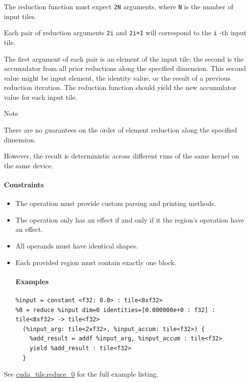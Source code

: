 \documentclass{article}
\begin{document}
The reduction function must expect \texttt{2N} arguments, where \texttt{N} is the number of input tiles.

Each pair of reduction arguments \texttt{2i} and \texttt{2i+1} will correspond to the \texttt{i} -th input tile.

The first argument of each pair is an element of the input tile; the second is the accumulator from all prior reductions along the specified dimension. This second value might be input element, the identity value, or the result of a previous reduction iteration. The reduction function should yield the new accumulator value for each input tile.


Note


There are no guarantees on the order of element reduction along the specified dimension.

However, the result is deterministic across different runs of the same kernel on the same device.



\paragraph{Constraints}

\begin{itemize}
\item The operation must provide custom parsing and printing methods.
\item The operation only has an effect if and only if it the region's operation have an effect.
\item All operands must have identical shapes.
\item Each provided region must contain exactly one block.


\paragraph{Examples}

\begin{lstlisting}
%input = constant <f32: 0.0> : tile<8xf32>
%0 = reduce %input dim=0 identities=[0.000000e+0 : f32] : tile<8xf32> -> tile<f32>
  (%input_arg: tile<2xf32>, %input_accum: tile<f32>) {
    %add_result = addf %input_arg, %input_accum : tile<f32>
    yield %add_result : tile<f32>
  }
\end{lstlisting}

\end{itemize}
See \href{https://docs.nvidia.com/cuda/tile-ir/latest/sections/appendix.html#example-cuda-tile-reduce-0}{cuda\_tile.reduce\_0} for the full example listing.
\end{document}
